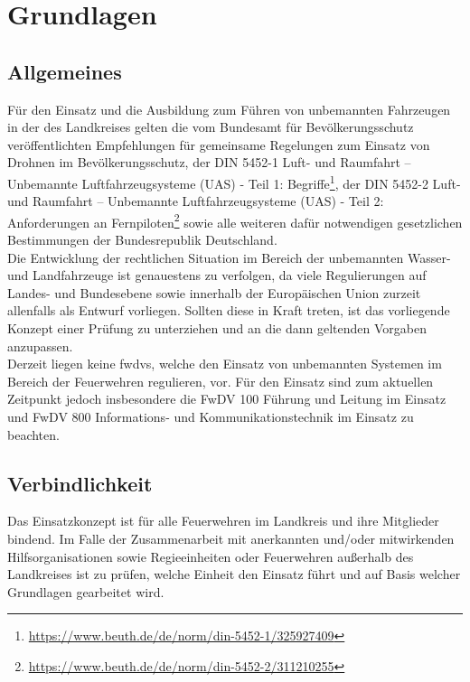 \section{Grundlagen}
\subsection{Allgemeines}

Für den Einsatz und die Ausbildung zum Führen von unbemannten Fahrzeugen in der \callee{} des Landkreises \district{} gelten die vom Bundesamt für Bevölkerungsschutz veröffentlichten \flq Empfehlungen für gemeinsame Regelungen zum Einsatz von Drohnen im Bevölkerungsschutz\frq{}, der DIN 5452-1 \flq Luft- und Raumfahrt – Unbemannte Luftfahrzeugsysteme  (UAS) - Teil 1: Begriffe\frq{}\footnote{\url{https://www.beuth.de/de/norm/din-5452-1/325927409}}, der DIN 5452-2 \flq Luft- und Raumfahrt – Unbemannte Luftfahrzeugsysteme (UAS) - Teil 2: Anforderungen an Fernpiloten\frq{}\footnote{\url{https://www.beuth.de/de/norm/din-5452-2/311210255}} sowie alle weiteren dafür notwendigen gesetzlichen Bestimmungen der Bundesrepublik Deutschland.\\

\noindent Die Entwicklung der rechtlichen Situation im Bereich der unbemannten Wasser- und Landfahrzeuge ist genauestens zu verfolgen, da viele Regulierungen auf Landes- und Bundesebene sowie innerhalb der Europäischen Union zurzeit allenfalls als Entwurf vorliegen. Sollten diese in Kraft treten, ist das vorliegende Konzept einer Prüfung zu unterziehen und an die dann geltenden Vorgaben anzupassen.\\

\noindent Derzeit liegen keine \acp{fwdv}, welche den Einsatz von unbemannten Systemen im Bereich der Feuerwehren regulieren, vor. Für den Einsatz sind zum aktuellen Zeitpunkt jedoch insbesondere die FwDV 100 \flq Führung und Leitung im Einsatz\frq{} und FwDV 800 \flq Informations- und Kommunikationstechnik im Einsatz\frq{} zu beachten.

\subsection{Verbindlichkeit}

Das Einsatzkonzept ist für alle Feuerwehren im Landkreis \district{} und ihre Mitglieder bindend. Im Falle der Zusammenarbeit mit anerkannten und/oder mitwirkenden Hilfsorganisationen sowie Regieeinheiten oder Feuerwehren außerhalb des Landkreises \district{} ist zu prüfen, welche Einheit den Einsatz führt und auf Basis welcher Grundlagen gearbeitet wird.\\


